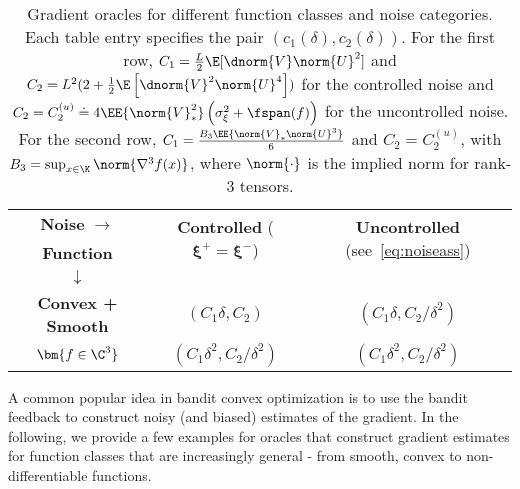 \begin{table*}
\small
\centering
\begin{tabular}{|c|c|c|}
\toprule
\textbf{Noise }$\bm{ \rightarrow}$ & \multirow{2}{*}{\textbf{Controlled }($\bm{\xi^+ = \xi^-}$)} & \multirow{2}{*}{\textbf{Uncontrolled }(see~\eqref{eq:noiseass})} \\ 
\textbf{Function } &&\\
$\bm{\downarrow}$ &&\\\midrule
\multirow{2}{*}{\textbf{Convex + Smooth}} & \multirow{2}{*}{$(C_1 \delta, C_2)$} & \multirow{2}{*}{$(C_1\delta, C_2/\delta^2)$}\\ 
 &&\\\midrule
\multirow{2}{*}{$\bm{f \in \C^3}$} & \multirow{2}{*}{$(C_1 \delta^2, C_2/\delta^2)$} & \multirow{2}{*}{$(C_1 \delta^2, C_2/\delta^2)$} \\ 
 &&\\\bottomrule
\end{tabular}
\caption{Gradient oracles for different function classes and noise categories. Each table entry specifies the pair $(c_1(\delta), c_2(\delta))$.
For the first row, $C_1 =
\frac{L}{2} \E[ \dnorm{V} \norm{U}^2]$ and
$C_2 =   L^2 (2 + \frac{1}{2}\E\left[ \dnorm{V}^2 \norm{U}^4 \right])$
for the controlled noise and 
 $C_2 =  C_{2}^{(u)} \doteq 4 \EE{\norm{V}_*^2}\left( \sigma_\xi^2+\fspan(f)\right)$ for the uncontrolled noise.
For the second row, $C_1 = \frac{B_3 \EE{ \norm{V}_* \norm{U}^3 }}{6}$ and $C_2 =  C_{2}^{(u)}$,
with $B_3 = \sup_{x\in \K} \norm{\nabla^3 f(x)}$, where $\norm{\cdot}$ is the implied norm for rank-3 tensors.
}
\label{tab:oracles}
\end{table*}
A common popular idea in bandit convex optimization is to use the bandit feedback to construct noisy (and biased) estimates of the gradient.
In the following, we provide a few examples for oracles that construct gradient estimates for function classes that are increasingly general - from smooth, convex to non-differentiable functions.


